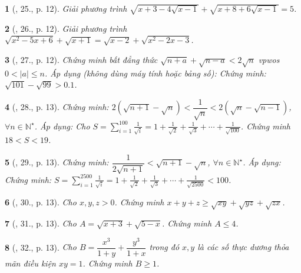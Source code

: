 \documentclass{article}
\newtheorem{baitoan}{}
\begin{document}
\begin{baitoan}[\cite{Tuyen_Toan_9_old}, 25., p. 12]
	Giải phương trình $\sqrt{x + 3 - 4\sqrt{x - 1}} + \sqrt{x + 8 + 6\sqrt{x - 1}} = 5$.
\end{baitoan}

\begin{baitoan}[\cite{Tuyen_Toan_9_old}, 26., p. 12]
	Giải phương trình $\sqrt{x^2 - 5x + 6} + \sqrt{x + 1} = \sqrt{x - 2} + \sqrt{x^2 - 2x - 3}$.
\end{baitoan}

\begin{baitoan}[\cite{Tuyen_Toan_9_old}, 27., p. 12]
	Chứng minh bất đẳng thức $\sqrt{n + a} + \sqrt{n - a} < 2\sqrt{n}$ vpwos $0 < |a|\le n$. Áp dụng (không dùng máy tính hoặc bảng số): Chứng minh: $\sqrt{101} - \sqrt{99} > 0.1$.
\end{baitoan}

\begin{baitoan}[\cite{Tuyen_Toan_9_old}, 28., p. 13]
	Chứng minh: $2(\sqrt{n + 1} - \sqrt{n}) < \dfrac{1}{\sqrt{n}} < 2(\sqrt{n} - \sqrt{n - 1})$, $\forall n\in\mathbb{N}^\star$. Áp dụng: Cho $S = \sum_{i=1}^{100} \frac{1}{\sqrt{i}} = 1 + \frac{1}{\sqrt{2}} + \frac{1}{\sqrt{3}} + \cdots + \frac{1}{\sqrt{100}}$. Chứng minh $18 < S < 19$.
\end{baitoan}

\begin{baitoan}[\cite{Tuyen_Toan_9_old}, 29., p. 13]
	Chứng minh: $\dfrac{1}{2\sqrt{n + 1}} < \sqrt{n + 1} - \sqrt{n}$, $\forall n\in\mathbb{N}^\star$. Áp dụng: Chứng minh: $S = \sum_{i=1}^{2500} \frac{1}{\sqrt{i}} = 1 + \frac{1}{\sqrt{2}} + \frac{1}{\sqrt{3}} + \cdots + \frac{1}{\sqrt{2500}} < 100$.
\end{baitoan}

\begin{baitoan}[\cite{Tuyen_Toan_9_old}, 30., p. 13]
	Cho $x,y,z > 0$. Chứng minh $x + y + z\ge\sqrt{xy} + \sqrt{yz} + \sqrt{zx}$.
\end{baitoan}

\begin{baitoan}[\cite{Tuyen_Toan_9_old}, 31., p. 13]
	Cho $A = \sqrt{x + 3} + \sqrt{5 - x}$. Chứng minh $A\le4$.
\end{baitoan}

\begin{baitoan}[\cite{Tuyen_Toan_9_old}, 32., p. 13]
	Cho $B = \dfrac{x^3}{1 + y} + \dfrac{y^3}{1 + x}$ trong đó $x,y$ là các số thực dương thỏa mãn điều kiện $xy = 1$. Chứng minh $B\ge1$.
\end{baitoan}
\end{document}

